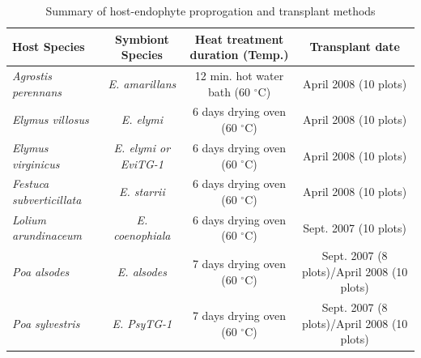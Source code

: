\documentclass[lineno, sn-basic]{sn-jnl}%
\begin{document}
\begin{table}\centering
	\caption{Summary of host-endophyte proprogation and transplant methods}

	\begin{tabular}{lccc}
		Host Species & Symbiont Species & Heat treatment duration (Temp.)& Transplant date\\
		\midrule
		\emph{Agrostis perennans} & \emph{E. amarillans}&12 min. hot water bath (60 $^{\circ}$C)&April 2008 (10 plots)\\
		\emph{Elymus villosus} &\emph{E. elymi}&6 days drying oven (60 $^{\circ}$C)&April 2008 (10 plots)\\
		\emph{Elymus virginicus} &\emph{E. elymi or EviTG-1}&6 days drying oven (60 $^{\circ}$C)&April 2008 (10 plots)\\
		\emph{Festuca subverticillata} &\emph{E. starrii}&6 days drying oven (60 $^{\circ}$C)&April 2008 (10 plots)\\
		\emph{Lolium arundinaceum} &\emph{E. coenophiala}&6 days drying oven (60 $^{\circ}$C)& Sept. 2007 (10 plots)\\
		\emph{Poa alsodes} &\emph{E. alsodes}& 7 days drying oven (60 $^{\circ}$C)&Sept. 2007 (8 plots)/April 2008 (10 plots)\\
		\emph{Poa sylvestris}&\emph{E. PsyTG-1}&7 days drying oven (60 $^{\circ}$C)& Sept. 2007 (8 plots)/April 2008 (10 plots)\\
		\bottomrule
	\end{tabular}
\end{table}

\bigskip
\end{document}
